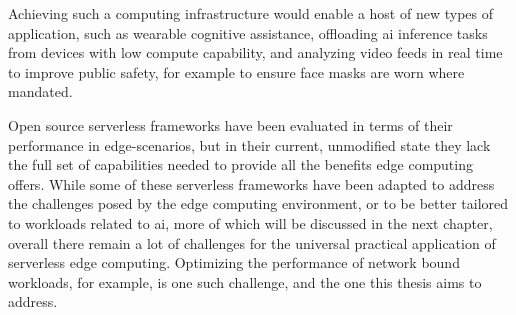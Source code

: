 Achieving such a computing infrastructure would enable a host of new types of application, such as wearable cognitive assistance\cite{haWearableCognitiveAssistance2014}\cite{rauschPlatformSmartCityScale2021}, offloading \gls{ai} inference tasks from devices with low compute capability\cite{liEdgeAIOnDemand2020}, and analyzing video feeds in real time to improve public safety\cite{zhangEdgeVideoAnalytics2019}, for example to ensure face masks are worn where mandated\cite{wangWearMaskFastInbrowser2021}.

Open source serverless frameworks have been evaluated in terms of their performance in edge-scenarios, but in their current, unmodified state they lack the full set of capabilities needed to provide all the benefits edge computing offers\cite{paladeEvaluationOpenSource2019}.
While some of these serverless frameworks have been adapted to address the challenges posed by the edge computing environment, or to be better tailored to workloads related to \gls{ai}\cite{rauschServerlessPlatformEdge}, more of which will be discussed in the next chapter, overall there remain a lot of challenges for the universal practical application of serverless edge computing\cite{aslanpourServerlessEdgeComputing2021}.
Optimizing the performance of network bound workloads, for example, is one such challenge\cite{skippy}, and the one this thesis aims to address.



